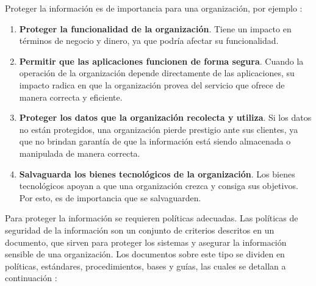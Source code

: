 Proteger la información es de importancia para una organización, por ejemplo \cite{WhiMat12}: 

\begin{enumerate}[noitemsep]
	\item \textbf{Proteger la funcionalidad de la organización}. Tiene un impacto en términos de negocio y dinero, ya que podría afectar su funcionalidad.
	\item \textbf{Permitir que las aplicaciones funcionen de forma segura}. Cuando la operación de la organización depende directamente de las aplicaciones, su impacto radica en que la organización provea del servicio que ofrece de manera correcta y eficiente.
	\item \textbf{Proteger los datos que la organización recolecta y utiliza}. Si los datos no están protegidos, una organización pierde prestigio ante sus clientes, ya que no brindan garantía de que la información está siendo almacenada o manipulada de manera correcta. 
	\item \textbf{Salvaguarda los bienes tecnológicos de la organización}. Los bienes tecnológicos apoyan a que una organización crezca y consiga sus objetivos. Por esto, es de importancia que se salvaguarden. 
\end{enumerate}


Para proteger la información se requieren políticas adecuadas. Las políticas de seguridad de la información son un conjunto de criterios descritos en un documento, que sirven para proteger los sistemas y asegurar la información sensible de una organización. Los documentos sobre este tipo se dividen en políticas, estándares, procedimientos, bases y guías, las cuales se detallan a continuación \cite{peltier2016information,Lan17}: 

